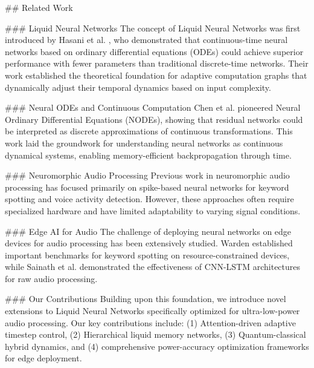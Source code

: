 ## Related Work

### Liquid Neural Networks
The concept of Liquid Neural Networks was first introduced by Hasani et al. \cite{hasani2021liquid}, 
who demonstrated that continuous-time neural networks based on ordinary differential equations (ODEs) 
could achieve superior performance with fewer parameters than traditional discrete-time networks. 
Their work established the theoretical foundation for adaptive computation graphs that dynamically 
adjust their temporal dynamics based on input complexity.

### Neural ODEs and Continuous Computation
Chen et al. \cite{chen2018neural} pioneered Neural Ordinary Differential Equations (NODEs), 
showing that residual networks could be interpreted as discrete approximations of continuous 
transformations. This work laid the groundwork for understanding neural networks as continuous 
dynamical systems, enabling memory-efficient backpropagation through time.

### Neuromorphic Audio Processing
Previous work in neuromorphic audio processing has focused primarily on spike-based neural 
networks for keyword spotting and voice activity detection. However, these approaches often 
require specialized hardware and have limited adaptability to varying signal conditions.

### Edge AI for Audio
The challenge of deploying neural networks on edge devices for audio processing has been 
extensively studied. Warden \cite{warden2018speech} established important benchmarks for 
keyword spotting on resource-constrained devices, while Sainath et al. \cite{sainath2015learning} 
demonstrated the effectiveness of CNN-LSTM architectures for raw audio processing.

### Our Contributions
Building upon this foundation, we introduce novel extensions to Liquid Neural Networks 
specifically optimized for ultra-low-power audio processing. Our key contributions include:
(1) Attention-driven adaptive timestep control, (2) Hierarchical liquid memory networks, 
(3) Quantum-classical hybrid dynamics, and (4) comprehensive power-accuracy optimization 
frameworks for edge deployment.